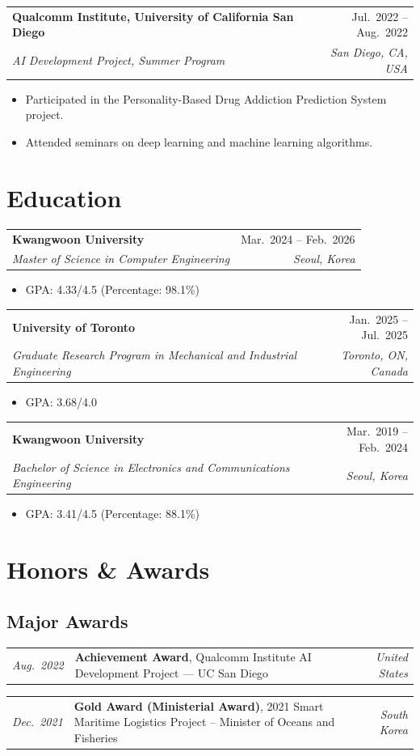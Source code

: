 \documentclass[11pt,letterpaper]{article}
\makeatletter
\newcommand{\entry}[4]{%
  \vspace{0.35em}\par
  \noindent\begin{tabularx}{\linewidth}{@{}X r@{}}
    \textbf{#1} & #2 \\[0.05em]
    \textit{#3} & \textit{#4}
  \end{tabularx}\par\vspace{0.1em}
}
\newcommand{\honor}[3]{%
  \noindent\begin{tabularx}{\linewidth}{@{}l X r@{}}
    \textit{\color{muted}#1} & #2 & \textit{\color{muted}#3}
  \end{tabularx}\par\vspace{0.1em}
}
\makeatother
\begin{document}
\entry{Qualcomm Institute, University of California San Diego}{Jul.\ 2022 -- Aug.\ 2022}{AI Development Project, Summer Program}{San Diego, CA, USA}
\begin{itemize}
  \item Participated in the Personality-Based Drug Addiction Prediction System project.
  \item Attended seminars on deep learning and machine learning algorithms.
\end{itemize}

\section{Education}

\entry{Kwangwoon University}{Mar.\ 2024 -- Feb.\ 2026}{Master of Science in Computer Engineering}{Seoul, Korea}
\begin{itemize}
  \item GPA: 4.33/4.5 (Percentage: 98.1\%)
\end{itemize}

\entry{University of Toronto}{Jan.\ 2025 -- Jul.\ 2025}{Graduate Research Program in Mechanical and Industrial Engineering}{Toronto, ON, Canada}
\begin{itemize}
  \item GPA: 3.68/4.0
\end{itemize}

\entry{Kwangwoon University}{Mar.\ 2019 -- Feb.\ 2024}{Bachelor of Science in Electronics and Communications Engineering}{Seoul, Korea}
\begin{itemize}
  \item GPA: 3.41/4.5 (Percentage: 88.1\%)
\end{itemize}

\section{Honors \& Awards}

\subsection{Major Awards}
\honor{Aug.\ 2022}{\textbf{Achievement Award}, Qualcomm Institute AI Development Project --- UC San Diego}{United States}
\honor{Dec.\ 2021}{\textbf{Gold Award (Ministerial Award)}, 2021 Smart Maritime Logistics Project -- Minister of Oceans and Fisheries}{South Korea}
\end{document}
